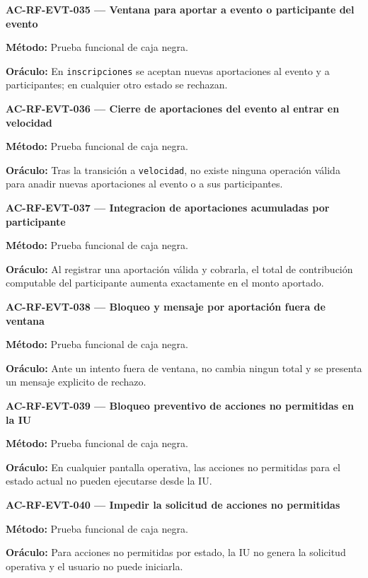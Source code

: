 \documentclass[10pt,letterpaper]{article}
\begin{document}
\noindent\textbf{AC-RF-EVT-035 --- Ventana para aportar a evento o participante del evento}\par
\textbf{Método:} Prueba funcional de caja negra.\par
\textbf{Oráculo:} En \texttt{inscripciones} se aceptan nuevas aportaciones al evento y a participantes; en cualquier otro estado se rechazan.\par\vspace{0.45em}
\noindent\textbf{AC-RF-EVT-036 --- Cierre de aportaciones del evento al entrar en velocidad}\par
\textbf{Método:} Prueba funcional de caja negra.\par
\textbf{Oráculo:} Tras la transición a \texttt{velocidad}, no existe ninguna operación válida para anadir nuevas aportaciones al evento o a sus participantes.\par\vspace{0.45em}
\noindent\textbf{AC-RF-EVT-037 --- Integracion de aportaciones acumuladas por participante}\par
\textbf{Método:} Prueba funcional de caja negra.\par
\textbf{Oráculo:} Al registrar una aportación válida y cobrarla, el total de contribución computable del participante aumenta exactamente en el monto aportado.\par\vspace{0.45em}
\noindent\textbf{AC-RF-EVT-038 --- Bloqueo y mensaje por aportación fuera de ventana}\par
\textbf{Método:} Prueba funcional de caja negra.\par
\textbf{Oráculo:} Ante un intento fuera de ventana, no cambia ningun total y se presenta un mensaje explicito de rechazo.\par\vspace{0.45em}
\noindent\textbf{AC-RF-EVT-039 --- Bloqueo preventivo de acciones no permitidas en la IU}\par
\textbf{Método:} Prueba funcional de caja negra.\par
\textbf{Oráculo:} En cualquier pantalla operativa, las acciones no permitidas para el estado actual no pueden ejecutarse desde la IU.\par\vspace{0.45em}
\noindent\textbf{AC-RF-EVT-040 --- Impedir la solicitud de acciones no permitidas}\par
\textbf{Método:} Prueba funcional de caja negra.\par
\textbf{Oráculo:} Para acciones no permitidas por estado, la IU no genera la solicitud operativa y el usuario no puede iniciarla.\par\vspace{0.45em}
\end{document}
